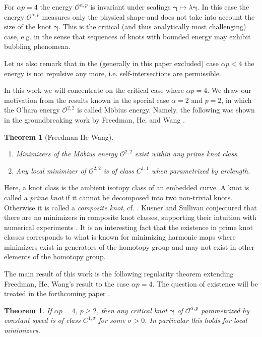 \documentclass[a4paper,10pt,intlimits,ngerman]{amsart}
\newtheorem{theorem}{Theorem}[section]
\newtheorem{mtheorem}{Theorem}
\numberwithin{equation}{section}
\newcommand{\sol}{{\boldsymbol{\gamma}}}
\begin{document}
For $\alpha p = 4$ the energy $\mathcal{O}^{\alpha,p}$ is invariant under scalings $\sol \mapsto \lambda \sol$. In this case the energy $\mathcal{O}^{\alpha,p}$ measures only the physical shape and does not take into account the size of the knot $\sol$. This is the critical (and thus analytically most challenging) case, e.g. in the sense that sequences of knots with bounded energy may exhibit bubbling phenomena.

Let us also remark that in the (generally in this paper excluded) case $\alpha p < 4$ the energy is not repulsive any more, i.e. self-intersections are permissible.

In this work we will concentrate on the critical case where $\alpha p = 4$. We draw our motivation from the results known in the special case $\alpha = 2$ and $p = 2$, in which the O'hara energy $\mathcal{O}^{2,2}$ is called M\"obius energy. Namely, the following was shown in the groundbreaking work by Freedman, He, and Wang \cite{Freedman1994}.
% 
\begin{theorem}[Freedman-He-Wang]\label{th:FHW}${}$
\begin{enumerate}
\item Minimizers of the M\"obius energy $\mathcal{O}^{2,2}$ exist within any prime knot class.
\item Any local minimizer of $\mathcal{O}^{2,2}$ is of class $C^{1,1}$ when parametrized by arclength.
\end{enumerate}
\end{theorem}
Here, a knot class is the ambient isotopy class of an embedded curve. A knot is called a \emph{prime knot} if it cannot be decomposed into two non-trivial knots. Otherwise it is called a \emph{composite knot}, cf. \cite{BZH}.
Kusner and Sullivan conjectured that there are no minimizers in composite knot classes, supporting their intuition with numerical experiments \cite{Kusner1998}. It is an interesting fact  that the existence in prime knot classes corresponds to what is known for minimizing harmonic maps \cite{SU81} where minimizers exist in generators of the homotopy group and may not exist in other elements of the homotopy group.

The main result of this work is the following regularity theorem extending Freedman, He, Wang's result to the case $\alpha p = 4$. The question of existence will be treated in the forthcoming paper \cite{BRS22}.
\begin{mtheorem}\label{th:regularity}
If $\alpha p = 4$, $p\geq 2$, then any critical knot $\sol$ of $\mathcal{O}^{\alpha,p}$ parametrized by constant speed is of class $C^{1,\sigma}$ for some $\sigma > 0$. In particular this holds for local minimizers.
\end{mtheorem}
\end{document}
